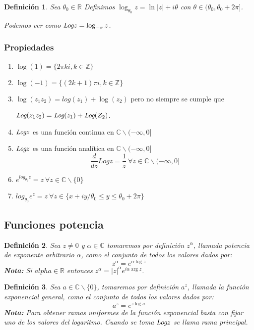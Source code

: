 \documentclass[10pt]{book}
\newtheorem{defi}{Definición}[chapter]
\newcommand{\R}{\mathbb{R}}
\newcommand{\C}{\mathbb{C}}
\newcommand{\Z}{\mathbb{Z}}
\newcommand{\Log}{\emph{Log}}
\begin{document}
\begin{defi}
Sea $\theta_0 \in\R$ Definimos $\log_{\theta_0} z = \ln |z| + i\theta$ con $\theta \in (\theta_0,\theta_0+2\pi]$.

Podemos ver como $\Log z = \log_{-\pi} z$.
\end{defi}

\subsubsection*{Propiedades}
\begin{enumerate}
\item $\log(1) = \{2\pi ki, k\in\Z \}$
\item $\log(-1) = \{(2k+1)\pi i, k\in\Z \}$
\item $\log(z_1z_2) = log(z_1)+\log(z_2)$ pero no siempre se cumple que 

$\Log(z_1z_2) = \Log(z_1) + \Log(Z_2)$.
\item $\Log z$ es una función continua en $\C \backslash (-\infty,0]$
\item  $\Log z$ es una función analítica en $\C \backslash (-\infty,0]$
$$ \frac{d}{dz}Log z = \frac{1}{z} \ \forall z \in \C \backslash (-\infty,0]$$
\item $e^{log_{\theta_0} z} = z \ \forall z \in \C \backslash\{0\}$
\item $log_{\theta_0} e^z=z \ \forall z \in\{x+iy / \theta_0 \leq y \leq \theta_0 + 2\pi\}$
\end{enumerate}

\subsection{Funciones potencia}
\begin{defi}
Sea $z\neq 0$ y $\alpha \in\C$ tomaremos por definición $z^\alpha$, llamada potencia de exponente arbitrario $\alpha$, como el conjunto de todos los valores dados por:
$$z^\alpha = e^{\alpha\log z}$$
\textbf{Nota:} Si $alpha \in\R$ entonces $z^\alpha = |z|^\alpha e^{i\alpha\arg z}$.
\end{defi}


\begin{defi}
Sea $a \in\C\backslash\{0\}$, tomaremos por definición $a^z$, llamada la función exponencial general, como el conjunto de todos los valores dados por:
$$a^z = e^{z\log a}$$
\textbf{Nota:} Para obtener ramas uniformes de la función exponencial basta con fijar uno de los valores del logaritmo. Cuando se toma $\Log z$ se llama rama principal.
\end{defi}
\end{document}
